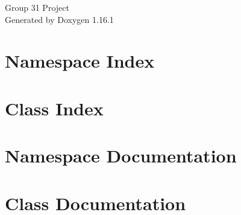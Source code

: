 \documentclass[twoside]{book}
\newcommand{\+}{\discretionary{\mbox{\scriptsize$\hookleftarrow$}}{}{}}
\newcommand{\clearemptydoublepage}{%
    \newpage{\pagestyle{empty}\cleardoublepage}%
  }
\begin{document}
  \raggedbottom
    \hypersetup{pageanchor=false,
                bookmarksnumbered=true,
                pdfencoding=unicode
               }
  \begin{titlepage}
  \vspace*{7cm}
  \begin{center}%
  {\Large Group 31 Project}\\
  \vspace*{1cm}
  {\large Generated by Doxygen 1.16.1}\\
  \end{center}
  \end{titlepage}
  \clearemptydoublepage
  \tableofcontents
  \clearemptydoublepage
  \hypersetup{pageanchor=true}



\chapter{Namespace Index}

\chapter{Class Index}

\chapter{Namespace Documentation}

\chapter{Class Documentation}

  \backmatter
  \newpage
  \clearemptydoublepage
  \printindex
\end{document}
